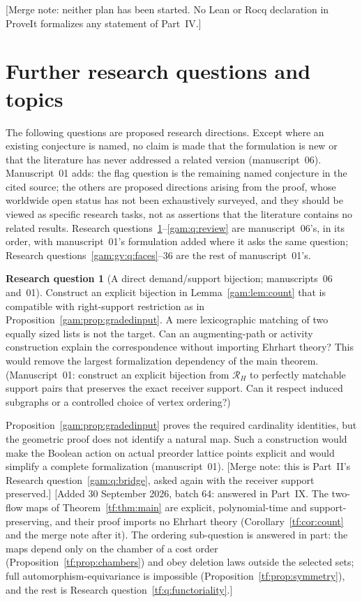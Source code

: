 \documentclass[11pt]{article}
\numberwithin{equation}{section}
\theoremstyle{definition}
\newtheorem{question}{Research question}%
\begin{document}
[Merge note: neither plan has been started. No Lean or Rocq declaration in
ProveIt formalizes any statement of Part~IV.]

\section{Further research questions and topics}\label{gam:sec:questions}
The following questions are proposed research directions. Except where an
existing conjecture is named, no claim is made that the formulation is new
or that the literature has never addressed a related version (manuscript~06).
Manuscript~01 adds: the flag question is the remaining named conjecture in
the cited source; the others are proposed directions arising from the proof,
whose worldwide open status has not been exhaustively surveyed, and they
should be viewed as specific research tasks, not as assertions that the
literature contains no related results. Research
questions~\ref{gam:q:first}--\ref{gam:q:review} are manuscript~06's, in its
order, with manuscript~01's formulation added where it asks the same
question; Research questions~\ref{gam:gv:q:faces}--36 are the rest of
manuscript~01's.

\begin{question}[A direct demand/support bijection; manuscripts~06 and~01]\label{gam:q:first}\label{gam:q:bijection}
Construct an explicit bijection in Lemma~\ref{gam:lem:count} that is compatible
with right-support restriction as in Proposition~\ref{gam:prop:gradedinput}.
A mere lexicographic matching of two equally sized lists is not the target.
Can an augmenting-path or activity construction explain the correspondence
without importing Ehrhart theory? This would remove the largest
formalization dependency of the main theorem. (Manuscript~01: construct an
explicit bijection from $\mathcal R_H$ to perfectly matchable support pairs
that preserves the exact receiver support. Can it respect induced subgraphs
or a controlled choice of vertex ordering?)
\end{question}
Proposition~\ref{gam:prop:gradedinput} proves the required cardinality
identities, but the geometric proof does not identify a natural map. Such a
construction would make the Boolean action on actual preorder lattice points
explicit and would simplify a complete formalization (manuscript~01).
[Merge note: this is Part~II's Research question~\ref{gam:q:bridge}, asked
again with the receiver support preserved.]
[Added 30 September 2026, batch 64: answered in Part~IX. The two-flow
maps of Theorem~\ref{tf:thm:main} are explicit, polynomial-time and
support-preserving, and their proof imports no Ehrhart theory
(Corollary~\ref{tf:cor:count} and the merge note after it). The
ordering sub-question is answered in part: the maps depend only on the
chamber of a cost order (Proposition~\ref{tf:prop:chambers}) and obey
deletion laws outside the selected sets; full automorphism-equivariance is
impossible (Proposition~\ref{tf:prop:symmetry}), and the rest is Research
question~\ref{tf:q:functoriality}.]
\end{document}

